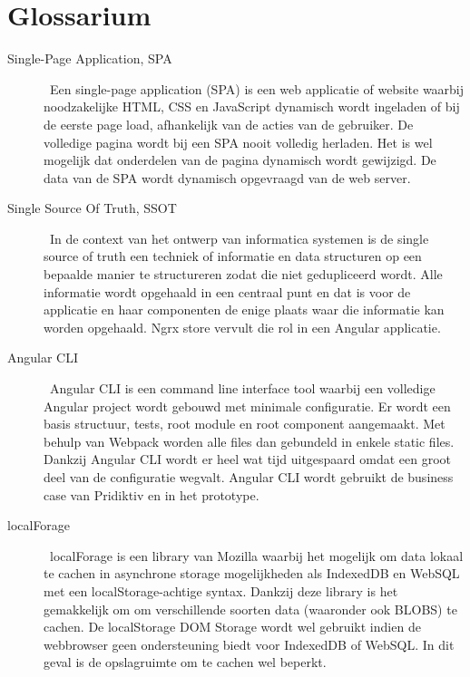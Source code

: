 
\chapter{Glossarium}
\label{ch:glossarium}


\begin{description}
\item[Single-Page Application, SPA] \hfill \ Een single-page application (SPA) is een web applicatie of website waarbij noodzakelijke HTML, CSS en JavaScript dynamisch wordt ingeladen of bij de eerste page load, afhankelijk van de acties van de gebruiker. De volledige pagina wordt bij een SPA nooit volledig herladen. Het is wel mogelijk dat onderdelen van de pagina dynamisch wordt gewijzigd. De data van de SPA wordt dynamisch opgevraagd van de web server. 
\item[Single Source Of Truth, SSOT] \hfill \ In de context van het ontwerp van informatica systemen is de single source of truth een techniek of informatie en data structuren op een bepaalde manier te structureren zodat die niet gedupliceerd wordt. Alle informatie wordt opgehaald in een centraal punt en dat is voor de applicatie en haar componenten de enige plaats waar die informatie kan worden opgehaald. Ngrx store vervult die rol in een Angular applicatie.
\item[Angular CLI] \hfill \ Angular CLI is een command line interface tool waarbij een volledige Angular project wordt gebouwd met minimale configuratie. Er wordt een basis structuur, tests, root module en root component aangemaakt. Met behulp van Webpack worden alle files dan gebundeld in enkele static files. Dankzij Angular CLI wordt er heel wat tijd uitgespaard omdat een groot deel van de configuratie wegvalt. Angular CLI wordt gebruikt de business case van Pridiktiv en in het prototype.
\item[localForage] \hfill \ localForage is een library van Mozilla waarbij het mogelijk om data lokaal te cachen in asynchrone storage mogelijkheden als IndexedDB en WebSQL met een localStorage-achtige syntax. Dankzij deze library is het gemakkelijk om om verschillende soorten data (waaronder ook BLOBS) te cachen. De localStorage DOM Storage wordt wel gebruikt indien de webbrowser geen ondersteuning biedt voor IndexedDB of WebSQL. In dit geval is de opslagruimte om te cachen wel beperkt.

\end{description}
